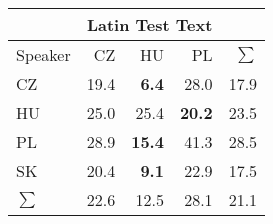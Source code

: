 \begin{tabular}{l|rrr|r}
\hline
 & \multicolumn{3}{c}{Latin Test Text} & \\
\hline
 Speaker   &   CZ &   HU &   PL &   $\sum$ \\
\hline
CZ        & 19.4 &  \bf{6.4} & 28.0 &     17.9 \\
HU        & 25.0 & 25.4 & \bf{20.2} &     23.5 \\
PL        & 28.9 & \bf{15.4} & 41.3 &     28.5 \\
SK        & 20.4 &  \bf{9.1} & 22.9 &     17.5 \\
\hline
 $\sum$   & 22.6 & 12.5 & 28.1 &     21.1 \\
\hline
\end{tabular}
